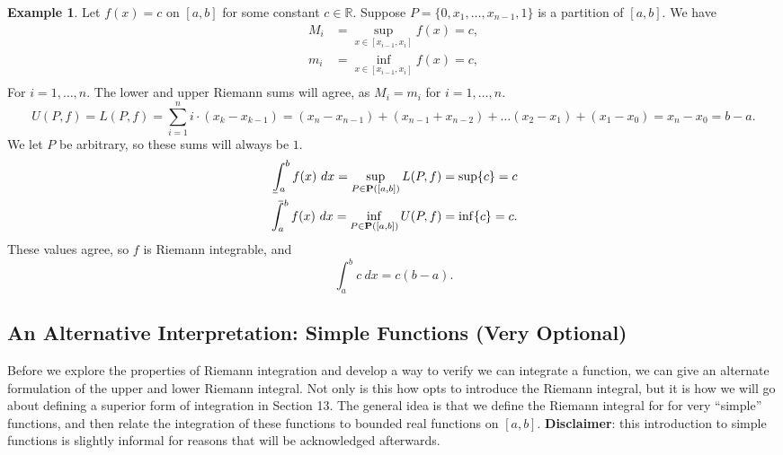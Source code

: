 \documentclass{article}
\def\upint{\mathchoice%
	{\mkern13mu\overline{\vphantom{\intop}\mkern7mu}\mkern-20mu}%
	{\mkern7mu\overline{\vphantom{\intop}\mkern7mu}\mkern-14mu}%
	{\mkern7mu\overline{\vphantom{\intop}\mkern7mu}\mkern-14mu}%
	{\mkern7mu\overline{\vphantom{\intop}\mkern7mu}\mkern-14mu}%
	\int}
\def\lowint{\mkern3mu\underline{\vphantom{\intop}\mkern7mu}\mkern-10mu\int}
\newcommand{\R}{\mathbb{R}}
\theoremstyle{definition}
\newtheorem{example}{Example}[section]
\begin{document}
\begin{example}
	Let $ f(x)=c $ on $ [a,b] $ for some constant $ c\in\R  $. Suppose $ P=\{0,x_1,\ldots,x_{n-1},1\} $ is a partition of $ [a,b] $. We have  \begin{align*}
			M_i&=\sup_{x\in[x_{i-1},x_i]} f(x)=c,\\
		m_i&=\inf_{x\in[x_{i-1},x_i]} f(x)=c,\\
	\end{align*} 
	For $ i=1,\ldots, n $. The lower and upper Riemann sums will agree, as $ M_i=m_i $ for $ i=1,\ldots, n $. $$ U(P,f)=L(P, f)=\sum_{i=1}^{n}i\cdot(x_k-x_{k-1})=(x_n-x_{n-1})+(x_{n-1}+x_{n-2})+\ldots (x_2-x_1)+(x_1-x_0)=x_n-x_0=b-a.$$ We let $ P $ be arbitrary, so these sums will always be $ 1 $.
	\begin{align*}
		\lowint_a^b f(x)\ dx=\sup\limits_{P\in\textbf{P}([a,b])} L(P,f)=\sup\{c\}=c\\ \upint_a^b f(x)\ dx =\inf\limits_{P\in\textbf{P}([a,b])} U(P,f)=\inf\{c\}=c.
	\end{align*}  
	These values agree, so $ f $ is Riemann integrable, and $$\int_{a}^{b} c\ dx=c(b-a) .$$
\end{example}
\subsection{An Alternative Interpretation: Simple Functions (Very Optional)}
Before we explore the properties of Riemann integration and develop a way to verify we can integrate a function, we can give an alternate formulation of the upper and lower Riemann integral. Not only is this  how \cite{tao2006analysis} opts to introduce the Riemann integral, but it is how we will go about defining a superior form of integration in Section 13. The general idea is that we define the Riemann integral for for very ``simple'' functions, and then relate the integration of these functions to bounded real functions on $ [a,b] $. \textbf{Disclaimer}: this introduction to simple functions is slightly informal for reasons that will be acknowledged afterwards. 
\end{document}
